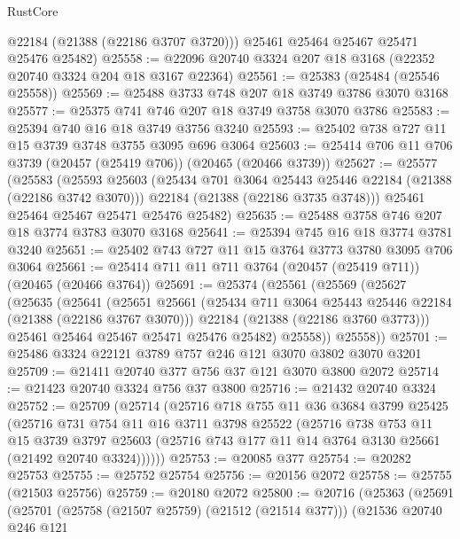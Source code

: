 \begin{lexlean}{RustCore}
\begin{coremodule}
        @22184
        (@21388 (@22186 @3707 @3720)))
      @25461
      @25464
      @25467
      @25471
      @25476
      @25482)
@25558 := @22096 @20740 @3324 @207 @18 @3168 (@22352 @20740 @3324 @204 @18 @3167 @22364)
@25561 := @25383 (@25484 (@25546 @25558))
@25569 := @25488 @3733 @748 @207 @18 @3749 @3786 @3070 @3168
@25577 := @25375 @741 @746 @207 @18 @3749 @3758 @3070 @3786
@25583 := @25394 @740 @16 @18 @3749 @3756 @3240
@25593 := @25402 @738 @727 @11 @15 @3739 @3748 @3755 @3095 @696 @3064
@25603 := @25414 @706 @11 @706 @3739 (@20457 (@25419 @706)) (@20465 (@20466 @3739))
@25627 := @25577
    (@25583
      (@25593
        @25603
        (@25434 @701 @3064 @25443 @25446 @22184 (@21388 (@22186 @3742 @3070)))
        @22184
        (@21388 (@22186 @3735 @3748)))
      @25461
      @25464
      @25467
      @25471
      @25476
      @25482)
@25635 := @25488 @3758 @746 @207 @18 @3774 @3783 @3070 @3168
@25641 := @25394 @745 @16 @18 @3774 @3781 @3240
@25651 := @25402 @743 @727 @11 @15 @3764 @3773 @3780 @3095 @706 @3064
@25661 := @25414 @711 @11 @711 @3764 (@20457 (@25419 @711)) (@20465 (@20466 @3764))
@25691 := @25374
    (@25561
      (@25569
        (@25627
          (@25635
            (@25641
              (@25651
                @25661
                (@25434 @711 @3064 @25443 @25446 @22184 (@21388 (@22186 @3767 @3070)))
                @22184
                (@21388 (@22186 @3760 @3773)))
              @25461
              @25464
              @25467
              @25471
              @25476
              @25482)
            @25558))
        @25558))
@25701 := @25486 @3324 @22121 @3789 @757 @246 @121 @3070 @3802 @3070 @3201
@25709 := @21411 @20740 @377 @756 @37 @121 @3070 @3800 @2072
@25714 := @21423 @20740 @3324 @756 @37 @3800
@25716 := @21432 @20740 @3324
@25752 := @25709
    (@25714
      (@25716
        @718
        @755
        @11
        @36
        @3684
        @3799
        @25425
        (@25716
          @731
          @754
          @11
          @16
          @3711
          @3798
          @25522
          (@25716
            @738
            @753
            @11
            @15
            @3739
            @3797
            @25603
            (@25716 @743 @177 @11 @14 @3764 @3130 @25661 (@21492 @20740 @3324))))))
@25753 := @20085 @377
@25754 := @20282 @25753
@25755 := @25752 @25754
@25756 := @20156 @2072
@25758 := @25755 (@21503 @25756)
@25759 := @20180 @2072
@25800 := @20716
    (@25363
      (@25691
        (@25701
          (@25758 (@21507 @25759) (@21512 (@21514 @377)))
          (@21536
            @20740
            @246
            @121

\end{coremodule}
\end{lexlean}
